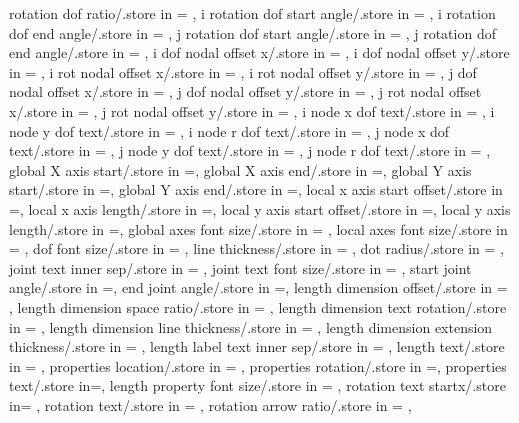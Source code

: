 {  rotation dof ratio/.store in = \rotationdofratio,
  i rotation dof start angle/.store in = \irotdofstartangle,
  i rotation dof end angle/.store in = \irotdofendangle,
  j rotation dof start angle/.store in = \jrotdofstartangle,
  j rotation dof end angle/.store in = \jrotdofendangle, 
  i dof nodal offset x/.store in = \idofnodaloffsetx,
  i dof nodal offset y/.store in = \idofnodaloffsety,
  i rot nodal offset x/.store in = \irotnodaloffsetx,
  i rot nodal offset y/.store in = \irotnodaloffsety,
  j dof nodal offset x/.store in = \jdofnodaloffsetx,
  j dof nodal offset y/.store in = \jdofnodaloffsety,
  j rot nodal offset x/.store in = \jrotnodaloffsetx,
  j rot nodal offset y/.store in = \jrotnodaloffsety,
  i node x dof text/.store in = \inodexdoftext,
  i node y dof text/.store in = \inodeydoftext,
  i node r dof text/.store in = \inoderdoftext,
  j node x dof text/.store in = \jnodexdoftext,
  j node y dof text/.store in = \jnodeydoftext,
  j node r dof text/.store in = \jnoderdoftext,
  global X axis start/.store in =\globalXstart,
  global X axis end/.store in =\globalXend,
  global Y axis start/.store in =\globalYstart,
  global Y axis end/.store in =\globalYend,
  local x axis start offset/.store in =\localxstartoffset,
  local x axis length/.store in =\localxlength,
  local y axis start offset/.store in =\localystartoffset,
  local y axis length/.store in =\localylength,
  global axes font size/.store in = \globalaxesfontsize,
  local axes font size/.store in = \localaxesfontsize,
  dof font size/.store in = \doffontsize,
  line thickness/.store in = \linethickness,
  dot radius/.store in = \dotradius,
  joint text inner sep/.store in = \jointinnersep,
  joint text font size/.store in = \jointtextfontsize,
  start joint angle/.store in =\startjointangle,
  end joint angle/.store in =\endjointangle,
  length dimension offset/.store in = \lengthdimoffset,
  length dimension space ratio/.store in = \lengthdimspaceratio,
  length dimension text rotation/.store in = \lengthlabelrotation,
  length dimension line thickness/.store in = \lengthdimlinethick,
  length dimension extension thickness/.store in = \lengthdimextthick,
  length label text inner sep/.store in = \lengthlabeltextinnersep,
  length text/.store in = \lengthtext,
  properties location/.store in = \propertyloc,
  properties rotation/.store in =\propertyrotation,
  properties text/.store in=\propertiestext,
  length property font size/.store in = \lengthpropfontsize,
  rotation text startx/.store in= \rotationanglex,
  rotation text/.store in = \rotationtext,
  rotation arrow ratio/.store in = \rotationarrowratio,
}
